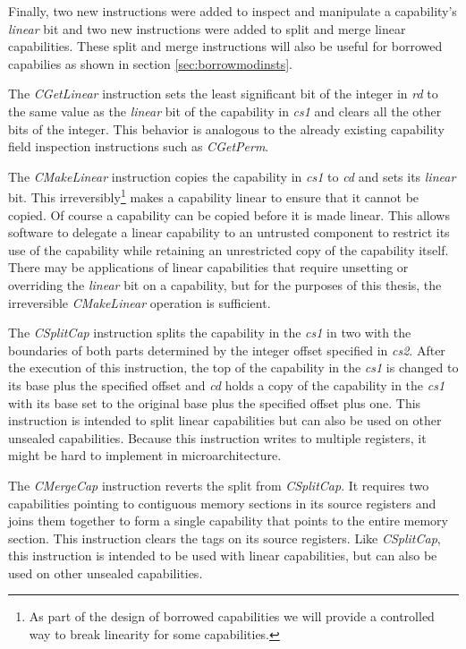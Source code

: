 Finally, two new instructions were added to inspect and manipulate a capability's \textit{linear} bit and two new instructions were added to split and merge linear capabilities. These split and merge instructions will also be useful for borrowed capabilies as shown in section \ref{sec:borrowmodinsts}.

The \textit{CGetLinear} instruction sets the least significant bit of the integer in \textit{rd} to the same value as the \textit{linear} bit of the capability in \textit{cs1} and clears all the other bits of the integer. This behavior is analogous to the already existing capability field inspection instructions such as \textit{CGetPerm}.

The \textit{CMakeLinear} instruction copies the capability in \textit{cs1} to \textit{cd} and sets its \textit{linear} bit. This irreversibly\footnote{As part of the design of borrowed capabilities we will provide a controlled way to break linearity for some capabilities.} makes a capability linear to ensure that it cannot be copied. Of course a capability can be copied before it is made linear. This allows software to delegate a linear capability to an untrusted component to restrict its use of the capability while retaining an unrestricted copy of the capability itself. There may be applications of linear capabilities that require unsetting or overriding the \textit{linear} bit on a capability, but for the purposes of this thesis, the irreversible \textit{CMakeLinear} operation is sufficient.

The \textit{CSplitCap} instruction splits the capability in the \textit{cs1} in two with the boundaries of both parts determined by the integer offset specified in \textit{cs2}. After the execution of this instruction, the top of the capability in the \textit{cs1} is changed to its base plus the specified offset and \textit{cd} holds a copy of the capability in the \textit{cs1} with its base set to the original base plus the specified offset plus one. This instruction is intended to split linear capabilities but can also be used on other unsealed capabilities. Because this instruction writes to multiple registers, it might be hard to implement in microarchitecture.

The \textit{CMergeCap} instruction reverts the split from \textit{CSplitCap}. It requires two capabilities pointing to contiguous memory sections in its source registers and joins them together to form a single capability that points to the entire memory section. This instruction clears the tags on its source registers. Like \textit{CSplitCap}, this instruction is intended to be used with linear capabilities, but can also be used on other unsealed capabilities.

